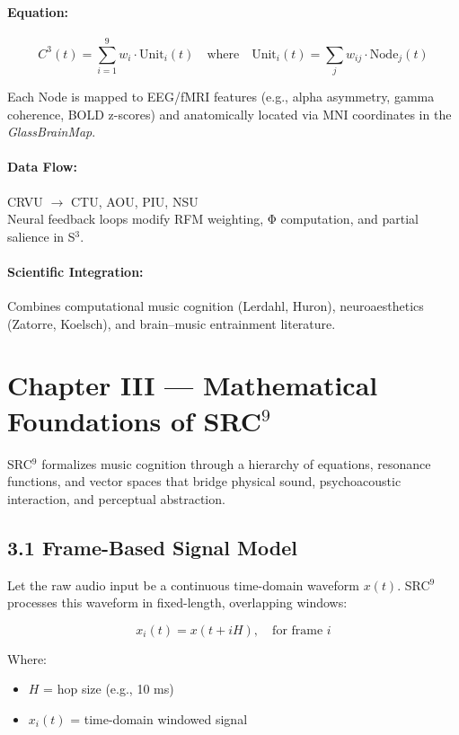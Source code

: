 \paragraph{Equation:}
\[
C^{3}(t) = \sum_{i=1}^{9} w_i \cdot \text{Unit}_i(t)
\quad \text{where} \quad
\text{Unit}_i(t) = \sum_j w_{ij} \cdot \text{Node}_j(t)
\]

Each Node is mapped to EEG/fMRI features (e.g., alpha asymmetry, gamma coherence, BOLD z-scores) and anatomically located via MNI coordinates in the \textit{GlassBrainMap}.

\paragraph{Data Flow:}
CRVU $\rightarrow$ CTU, AOU, PIU, NSU \\
Neural feedback loops modify RFM weighting, Φ computation, and partial salience in S$^{3}$.

\paragraph{Scientific Integration:}  
Combines computational music cognition (Lerdahl, Huron), neuroaesthetics (Zatorre, Koelsch), and brain–music entrainment literature.

\section*{Chapter III — Mathematical Foundations of SRC$^{9}$}

SRC$^{9}$ formalizes music cognition through a hierarchy of equations, resonance functions, and vector spaces that bridge physical sound, psychoacoustic interaction, and perceptual abstraction.

\subsection*{3.1 Frame-Based Signal Model}

Let the raw audio input be a continuous time-domain waveform $x(t)$. SRC$^{9}$ processes this waveform in fixed-length, overlapping windows:

\begin{equation}
x_i(t) = x(t + iH), \quad \text{for frame } i
\end{equation}

Where:
\begin{itemize}
  \item $H$ = hop size (e.g., 10 ms)
  \item $x_i(t)$ = time-domain windowed signal
\end{itemize}

